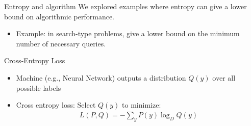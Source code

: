  \begin{parag}{Entropy and algorithm}
     We explored examples where entropy can give a lower bound on algorithmic performance.
     \begin{itemize}
         \item Example: in search-type problems, give a lower bound on the minimum number of necessary queries.
     \end{itemize}
 
 \end{parag}
    
 \begin{parag}{Cross-Entropy Loss}
     \begin{itemize}
         \item Machine (e.g., Neural Network) outputs a distribution $Q(y)$ over all possible labels
         \item Cross entropy loss: Select $Q(y)$ to minimize:
             \begin{align*}
                 L(P, Q) = - \sum_y P(y)\log_DQ(y)
             \end{align*}
             
     \end{itemize}
 
 \end{parag}
 
    

